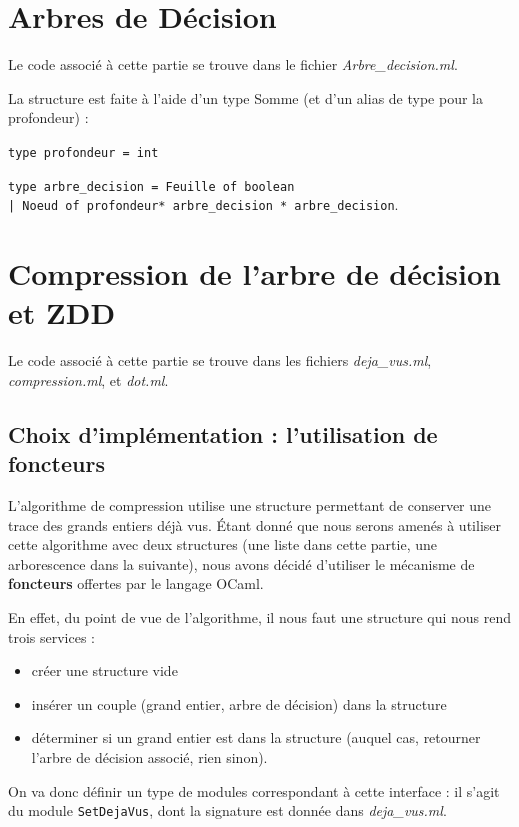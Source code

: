 \documentclass[12pt,a4paper]{article}
\begin{document}
\section{Arbres de Décision}
Le code associé à cette partie se trouve dans le fichier \textit{Arbre\_decision.ml}.

La structure est faite à l'aide d'un type Somme (et d'un alias de type pour la profondeur) :

\medskip
\texttt{type profondeur = int}

 \texttt{type arbre\_decision = Feuille of boolean \\
 | Noeud of profondeur* arbre\_decision * arbre\_decision}.

\medskip


\section{Compression de l’arbre de décision et ZDD}

Le code associé à cette partie se trouve dans les fichiers \textit{deja\_vus.ml}, \textit{compression.ml}, et \textit{dot.ml}.

\subsection{Choix d'implémentation : l'utilisation de foncteurs}

L'algorithme de compression utilise une structure permettant de conserver une trace des grands entiers déjà vus. Étant donné que nous serons amenés à utiliser cette algorithme avec deux structures (une liste dans cette partie, une arborescence dans la suivante), nous avons décidé d'utiliser le mécanisme de \textbf{foncteurs} offertes par le langage OCaml.

En effet, du point de vue de l'algorithme, il nous faut une structure qui nous rend trois services : 

\begin{itemize}
\item créer une structure vide
\item insérer un couple (grand entier, arbre de décision) dans la structure
\item déterminer si un grand entier est dans la structure (auquel cas, retourner l'arbre de décision associé, rien sinon).
\end{itemize}

On va donc définir un type de modules correspondant à cette interface : il s'agit du module \texttt{SetDejaVus}, dont la signature est donnée dans \textit{deja\_vus.ml}.
\end{document}
